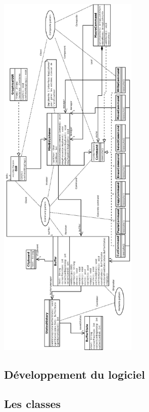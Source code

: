\documentclass[a4paper]{article}
\begin{document}
	\begin{center}
		\includegraphics[width=0.5\textwidth]{UML.png}~
	\end{center}

	\newpage
	


	\begin{center}
		\section{Développement du logiciel}
	\end{center}

	\vspace{0.5cm}

		\subsection{Les classes}
\end{document}
